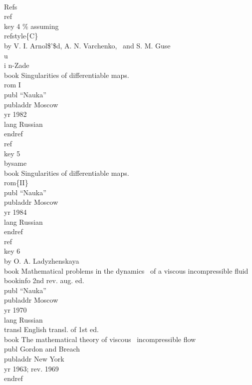\pagewidth{23pc}
\beginexample{\exindent=0pt}
\\Refs
\\ref\\key 4 \% assuming \\refstyle\{C\} 
\\by V. I. Arnol\$'\$d, A. N. Varchenko,
\ and S. M. Guse\\u\\i n-Zade
\\book Singularities of differentiable maps.~\\rom I
\\publ ``Nauka'' \\publaddr Moscow \\yr 1982
\\lang Russian
\\endref
\ {}
\\ref\\key 5\\bysame 
\\book Singularities of differentiable maps.~\\rom\{II\}
\\publ ``Nauka'' \\publaddr Moscow \\yr 1984
\\lang Russian
\\endref
\ {}
\\ref\\key 6
\\by O. A. Ladyzhenskaya
\\book Mathematical problems in the dynamics
\ of a viscous incompressible fluid 
\\bookinfo 2nd rev. aug. ed.
\\publ ``Nauka'' \\publaddr Moscow \\yr 1970
\\lang Russian
\\transl English transl. of 1st ed.
\\book The mathematical theory of viscous
\ incompressible flow
\\publ Gordon and Breach \\publaddr New York
\\yr 1963; rev. 1969
\\endref
\endexample

\newpage

